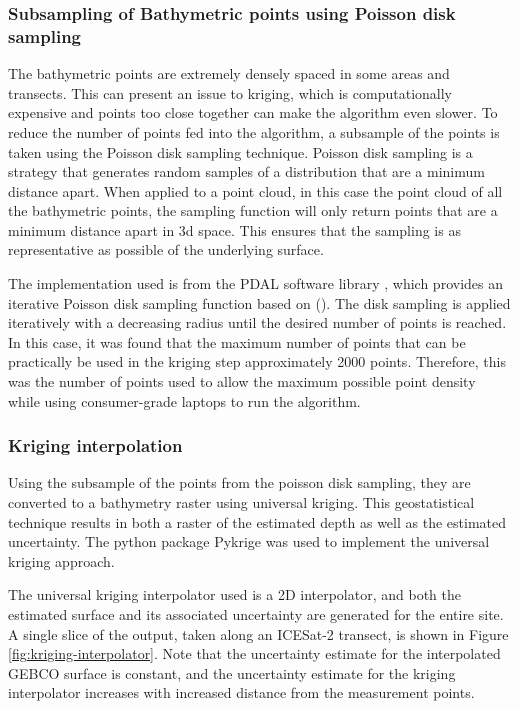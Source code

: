 \subsubsection{Subsampling of Bathymetric points using Poisson disk sampling}  \label{subsec:poissonsubsampling}
The bathymetric points are extremely densely spaced in some areas and transects. This can present an issue to kriging, which is computationally expensive and points too close together can make the algorithm even slower. To reduce the number of points fed into the algorithm, a subsample of the points is taken using the Poisson disk sampling technique. Poisson disk sampling is a strategy that generates random samples of a distribution that are a minimum distance apart. When applied to a point cloud, in this case the point cloud of all the bathymetric points, the sampling function will only return points that are a minimum distance apart in 3d space. This ensures that the sampling is as representative as possible of the underlying surface.

The implementation used is from the PDAL software library \parencite{howard_butler_2022_6369164}, which provides an iterative Poisson disk sampling function based on \citeauthor{McCool1992} (\citeyear{McCool1992}). The disk sampling is applied iteratively with a decreasing radius until the desired number of points is reached. In this case, it was found that the maximum number of points that can be practically be used in the kriging step approximately 2000 points. Therefore, this was the number of points used to allow the maximum possible point density while using consumer-grade laptops to run the algorithm. 

\subsubsection{Kriging interpolation}
Using the subsample of the points from the poisson disk sampling, they are converted to a bathymetry raster using universal kriging. This geostatistical technique results in both a raster of the estimated depth as well as the estimated uncertainty. The python package Pykrige \parencite{benjamin_murphy_2021_5380342} was used to implement the universal kriging approach. 

The universal kriging interpolator used is a 2D interpolator, and both the estimated surface and its associated uncertainty are generated for the entire site. A single slice of the output, taken along an ICESat-2 transect, is shown in Figure \ref{fig:kriging-interpolator}. Note that the uncertainty estimate for the interpolated GEBCO surface is constant, and the uncertainty estimate for the kriging interpolator increases with increased distance from the measurement points. 

